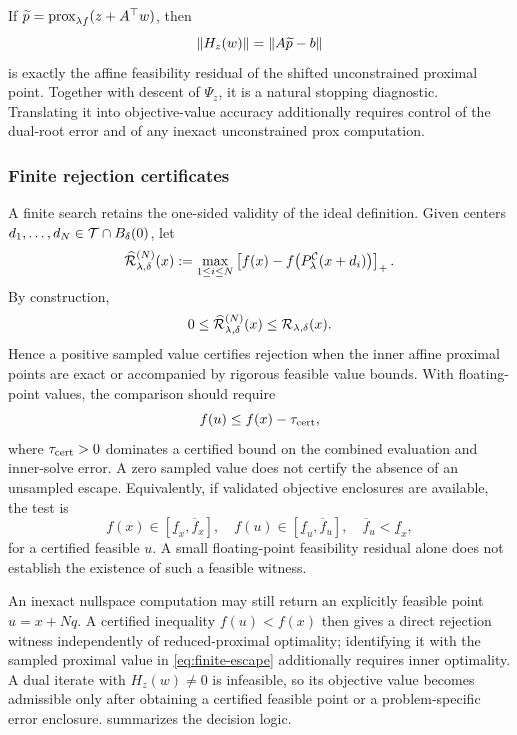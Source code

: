 If
\(\widetilde p=\operatorname{prox}_{\lambda f}(z+A^\top w)\), then
\begin{equation}
  \left\lVert H_z(w)\right\rVert=\left\lVert A\widetilde p-b\right\rVert
  \label{eq:dual-feasibility-residual}
\end{equation}
is exactly the affine feasibility residual of the shifted unconstrained
proximal point.  Together with descent of \(\Psi_z\), it is a natural stopping
diagnostic.  Translating it into objective-value accuracy additionally
requires control of the dual-root error and of any inexact unconstrained prox
computation.

\subsubsection{Finite rejection certificates}

A finite search retains the one-sided validity of the ideal definition.
Given centers \(d_1,\ldots,d_N\in\mathcal{T}\cap B_\delta(0)\), let
\begin{equation}
  \widehat{\mathcal{R}}_{\lambda,\delta}^{(N)}(x)
  :=
  \max_{1\le i\le N}
  \left[
    f(x)-f\!\left(P_\lambda^{\mathcal{C}}(x+d_i)\right)
  \right]_+.
  \label{eq:finite-escape}
\end{equation}
By construction,
\begin{equation}
  0
  \le
  \widehat{\mathcal{R}}_{\lambda,\delta}^{(N)}(x)
  \le
  \mathcal{R}_{\lambda,\delta}(x).
  \label{eq:finite-escape-bound}
\end{equation}
Hence a positive sampled value certifies rejection when the inner affine
proximal points are exact or accompanied by rigorous feasible value bounds.
With floating-point values, the comparison should require
\[
  f(u)\le f(x)-\tau_{\rm cert},
\]
where \(\tau_{\rm cert}>0\) dominates a certified bound on the combined
evaluation and inner-solve error.  A zero sampled value does not certify the
absence of an unsampled escape.  Equivalently, if validated objective
enclosures are available, the test is
\[
  f(x)\in[\underline f_x,\overline f_x],\quad
  f(u)\in[\underline f_u,\overline f_u],\quad
  \overline f_u<\underline f_x,
\]
for a certified feasible \(u\).  A small floating-point feasibility
residual alone does not establish the existence of such a feasible witness.

An inexact nullspace computation may still return an explicitly feasible
point \(u=x+Nq\).  A certified inequality \(f(u)<f(x)\) then gives a direct
rejection witness independently of reduced-proximal optimality; identifying
it with the sampled proximal value in \cref{eq:finite-escape} additionally
requires inner optimality.  A dual iterate with \(H_z(w)\ne0\) is infeasible,
so its objective value becomes admissible only after obtaining a certified
feasible point or a problem-specific error enclosure.
 summarizes the decision logic.

